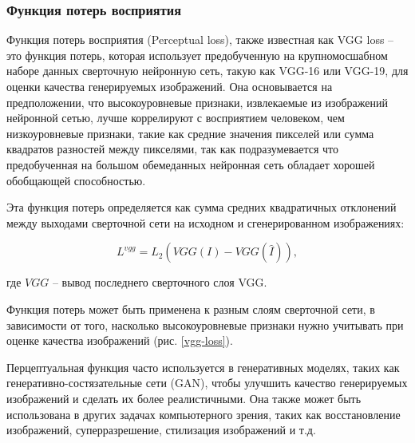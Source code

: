 \subsubsection{Функция потерь восприятия}

Функция потерь восприятия (Perceptual loss), также известная как VGG loss -- это функция потерь, которая использует предобученную на крупномосшабном наборе данных сверточную нейронную сеть, такую как VGG-16 или VGG-19, для оценки качества генерируемых изображений. Она основывается на предположении, что высокоуровневые признаки, извлекаемые из изображений нейронной сетью, лучше коррелируют с восприятием человеком, чем низкоуровневые признаки, такие как средние значения пикселей или сумма квадратов разностей между пикселями, так как подразумевается что предобученная на большом обемеданных нейронная сеть обладает хорошей обобщающей способностью.

Эта функция потерь определяется как сумма средних квадратичных отклонений между выходами сверточной сети на исходном и сгенерированном изображениях:

\begin{equation}
    \label{eq:2-1-3-1}
    L^{vgg} = L_{2}(VGG(I)-VGG(\hat{I})),
\end{equation}

где $VGG$ -- вывод последнего сверточного слоя VGG.

Функция потерь может быть применена к разным слоям сверточной сети, в зависимости от того, насколько высокоуровневые признаки нужно учитывать при оценке качества изображений (рис. \ref{vgg-loss}). 


Перцептуальная функция часто используется в генеративных моделях, таких как генеративно-состязательные сети (GAN), чтобы улучшить качество генерируемых изображений и сделать их более реалистичными. Она также может быть использована в других задачах компьютерного зрения, таких как восстановление изображений, суперразрешение, стилизация изображений и т.д.